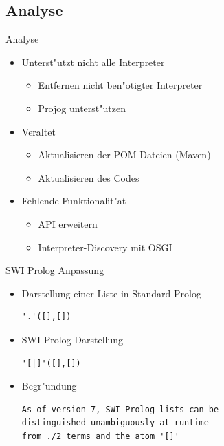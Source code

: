 \documentclass[18pt]{beamer}
\begin{document}
\subsection{Analyse}
\begin{frame}{Analyse}
\begin{itemize}
\item Unterst"utzt nicht alle Interpreter
\begin{itemize}
\item Entfernen nicht ben"otigter Interpreter
\item Projog unterst"utzen
\end{itemize}
\vspace{0.2cm}
\item Veraltet
\begin{itemize}
\item Aktualisieren der POM-Dateien (Maven)
\item Aktualisieren des Codes
\end{itemize}
\vspace{0.2cm}
\item Fehlende Funktionalit"at
\begin{itemize}
\item API erweitern
\item Interpreter-Discovery mit OSGI
\end{itemize}
\end{itemize}
\end{frame}
\begin{frame}[fragile]{SWI Prolog Anpassung}
\begin{itemize}
\item Darstellung einer Liste in Standard Prolog
\begin{verbatim}
'.'([],[])
\end{verbatim}
\item SWI-Prolog Darstellung
\begin{verbatim}
'[|]'([],[])
\end{verbatim}
\vspace{0.5cm}
\item Begr"undung
\begin{verbatim}
As of version 7, SWI-Prolog lists can be 
distinguished unambiguously at runtime
from ./2 terms and the atom '[]'
\end{verbatim}
\end{itemize}
\end{frame}
\end{document}

